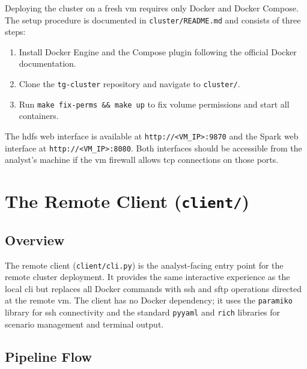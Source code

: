Deploying the cluster on a fresh \gls{vm} requires only Docker and Docker Compose.  The setup
procedure is documented in \texttt{cluster/README.md} and consists of three steps:

\begin{enumerate}
  \item Install Docker Engine and the Compose plugin following the official Docker documentation.
  \item Clone the \texttt{tg-cluster} repository and navigate to \texttt{cluster/}.
  \item Run \texttt{make fix-perms \&\& make up} to fix volume permissions and start all
        containers.
\end{enumerate}

The \gls{hdfs} web interface is available at \texttt{http://<VM\_IP>:9870} and the Spark web
interface at \texttt{http://<VM\_IP>:8080}.  Both interfaces should be accessible from the
analyst's machine if the \gls{vm} firewall allows \gls{tcp} connections on those ports.

\section{The Remote Client (\texttt{client/})}
\label{sec:rm-client}

\subsection{Overview}
\label{subsec:rm-client-overview}

The remote client (\texttt{client/cli.py}) is the analyst-facing entry point for the
remote cluster deployment.  It provides the same interactive experience as the local \gls{cli}
but replaces all Docker commands with \gls{ssh} and \gls{sftp} operations directed at the remote
\gls{vm}.  The client has no Docker dependency; it uses the \texttt{paramiko} library
\parencite{paramiko2024} for \gls{ssh} connectivity and the standard \texttt{pyyaml} and
\texttt{rich} libraries for scenario management and terminal output.

\subsection{Pipeline Flow}
\label{subsec:rm-pipeline-flow}

